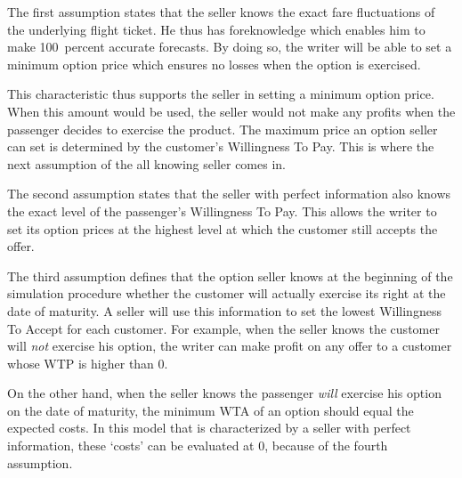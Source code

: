 The first assumption states that the seller knows the exact fare fluctuations of the underlying flight ticket. He thus has foreknowledge which enables him to make 100~percent accurate forecasts. By doing so, the writer will be able to set a minimum option price which ensures no losses when the option is exercised.

This characteristic thus supports the seller in setting a minimum option price. When this amount would be used, the seller would not make any profits when the passenger decides to exercise the product. The maximum price an option seller can set is determined by the customer's Willingness To Pay. This is where the next assumption of the all knowing seller comes in.

The second assumption states that the seller with perfect information also knows the exact level of the passenger's Willingness To Pay. This allows the writer to set its option prices at the highest level at which the customer still accepts the offer.

The third assumption defines that the option seller knows at the beginning of the simulation procedure whether the customer will actually exercise its right at the date of maturity. A seller will use this information to set the lowest Willingness To Accept for each customer. For example, when the seller knows the customer will \emph{not} exercise his option, the writer can make profit on any offer to a customer whose WTP is higher than $0$.

On the other hand, when the seller knows the passenger \emph{will} exercise his option on the date of maturity, the minimum WTA of an option should equal the expected costs. In this model that is characterized by a seller with perfect information, these `costs' can be evaluated at $0$, because of the fourth assumption.

